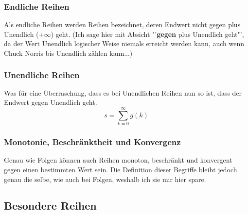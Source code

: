 \subsubsection{Endliche Reihen}
Als endliche Reihen werden Reihen bezeichnet, deren Endwert nicht gegen plus Unendlich ($+\infty$) geht. (Ich sage hier mit Absicht "'\textbf{gegen} plus Unendlich geht"', da der Wert Unendlich logischer Weise niemals erreicht werden kann, auch wenn Chuck Norris bis Unendlich zählen kann...)

\subsubsection{Unendliche Reihen}
Was für eine Überraschung, dass es bei Unendlichen Reihen nun so ist, dass der Endwert gegen Unendlich geht.
\begin{equation*}
s = \sum\limits_{k=0}^{\infty}g(k)
\end{equation*}

\subsubsection{Monotonie, Beschränktheit und Konvergenz}
Genau wie Folgen können auch Reihen monoton, beschränkt und konvergent gegen einen bestimmten Wert sein. Die Definition dieser Begriffe bleibt jedoch genau die selbe, wie auch bei Folgen, weshalb ich sie mir hier spare.

\subsection{Besondere Reihen}

